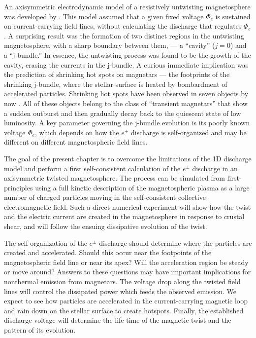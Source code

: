 An axisymmetric electrodynamic model of a resistively untwisting magnetosphere
was developed by
\citet[hereafter B09]{beloborodov_untwisting_2009}.
This model assumed
that a given fixed voltage $\Phi_e$ is sustained on current-carrying field lines,
without calculating the discharge that regulates $\Phi_e$.
A surprising result was
the formation of two distinct regions in the untwisting magnetosphere, with a
sharp boundary between them, --- a ``cavity'' ($j=0$) and a ``j-bundle.'' In
essence, the untwisting process was found to be the growth of the cavity,
erasing the currents in the j-bundle. A curious immediate implication was the
prediction of shrinking hot spots on magnetars --- the footprints of the
shrinking j-bundle, where the stellar surface is heated by bombardment of
  accelerated particles. Shrinking hot spots have been observed in seven
objects by now
\citetext{see data compilation in \citealp{beloborodov_magnetar_2016}}.
All of these objects
belong to the class of ``transient magnetars'' that show a sudden outburst and then
gradually decay back to the quiescent state of low luminosity.
A key parameter governing the j-bundle evolution is its poorly known voltage $\Phi_e$,
which depends on how the $e^\pm$ discharge is self-organized and
may be different on different magnetospheric field lines.

The goal of the present chapter is to overcome the limitations of the 1D discharge
model and perform a first self-consistent calculation of the $e^\pm$ discharge
in an axisymmetric twisted magnetosphere. The process can be simulated from
first-principles using a full kinetic description of the magnetospheric plasma
as a large number of charged particles moving in the self-consistent collective
electromagnetic field. Such a direct numerical experiment will show how the
twist and the electric current are created in the magnetosphere in response to
crustal shear, and will follow the ensuing dissipative evolution of the twist.

The self-organization of the $e^\pm$ discharge should determine where the
particles are created and accelerated. Should this occur near the footpoints of
the magnetospheric field line or near its apex? Will the acceleration region be
steady or move around? Answers to these questions may have important
implications for nonthermal emission from magnetars. The voltage drop along the
twisted field lines will control the dissipated power which feeds the observed
emission. We expect to see how particles are accelerated in the current-carrying
magnetic loop and rain down on the stellar surface to create hotspots. Finally,
the established discharge voltage will determine the life-time of the magnetic
twist and the pattern of its evolution.

